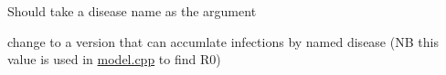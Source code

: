 
\begin{DoxyRefList}
\item[\label{todo__todo000002}%
\Hypertarget{todo__todo000002}%
Member \mbox{\hyperlink{classagent_ae186a297218e835ac064bf7a329d5b42}{agent\+:\+:infectious}} ()]Should take a disease name as the argument 
\item[\label{todo__todo000001}%
\Hypertarget{todo__todo000001}%
Member \mbox{\hyperlink{classagent_a4145c90d534f84deb22a93560809134c}{agent\+:\+:number\+Infected}} ]change to a version that can accumlate infections by named disease (NB this value is used in \mbox{\hyperlink{model_8cpp}{model.\+cpp}} to find R0) 
\end{DoxyRefList}